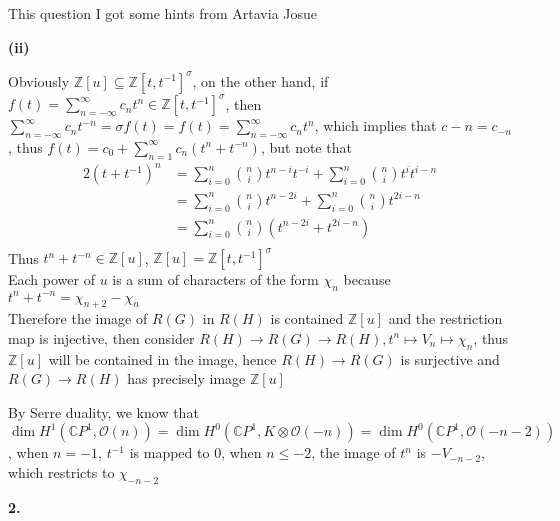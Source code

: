 \documentclass[10pt]{article}
\begin{document}
This question I got some hints from Artavia Josue \par
\textbf{(ii)} \par
Obviously $\mathbb Z[u]\subseteq\mathbb Z[t,t^{-1}]^\sigma$, on the other hand, if $f(t)=\displaystyle\sum_{n=-\infty}^\infty c_n t^n\in\mathbb Z[t,t^{-1}]^\sigma$, then $\displaystyle\sum_{n=-\infty}^\infty c_n t^{-n}=\sigma f(t)=f(t)=\sum_{n=-\infty}^\infty c_n t^{n}$, which implies that $c-n=c_{-n}$, thus $f(t)=\displaystyle c_0+\sum_{n=1}^\infty c_n(t^n+t^{-n})$, but note that\begin{align*}
2(t+t^{-1})^{n}
&=\displaystyle\sum_{i=0}^n\binom{n}{i}t^{n-i}t^{-i}+\sum_{i=0}^n\binom{n}{i}t^{i}t^{i-n} \\
&=\sum_{i=0}^n\binom{n}{i}t^{n-2i}+\sum_{i=0}^n\binom{n}{i}t^{2i-n} \\
&=\sum_{i=0}^n\binom{n}{i}(t^{n-2i}+t^{2i-n}) \\
\end{align*}
Thus $t^n+t^{-n}\in\mathbb Z[u]$, $\mathbb Z[u]=\mathbb Z[t,t^{-1}]^\sigma$ \\
Each power of $u$ is a sum of characters of the form $\chi_n$ because $t^n+t^{-n}=\chi_{n+2}-\chi_n$ \\
Therefore the image of $R(G)$ in $R(H)$ is contained $\mathbb Z[u]$ and the restriction map is injective, then consider $R(H)\to R(G)\to R(H),t^n\mapsto V_n\mapsto\chi_n$, thus $\mathbb Z[u]$ will be contained in the image, hence $R(H)\to R(G)$ is surjective and $R(G)\to R(H)$ has precisely image $\mathbb Z[u]$ \par
By Serre duality, we know that $\dim H^1(\mathbb CP^1,\mathcal O(n))=\dim H^0(\mathbb CP^1,K\otimes\mathcal O(-n))=\dim H^0(\mathbb CP^1,\mathcal O(-n-2))$, when $n=-1$, $t^{-1}$ is mapped to $0$, when $n\leq-2$, the image of $t^n$ is $-V_{-n-2}$, which restricts to $\chi_{-n-2}$ \par
\textbf{2.} \par
\end{document}
